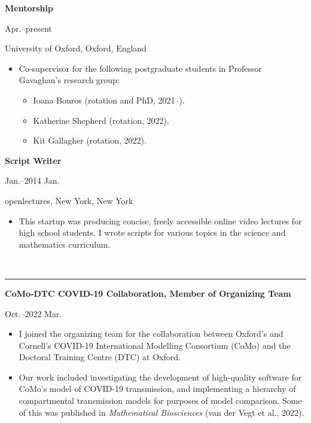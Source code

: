 \documentclass[11pt]{article}
\begin{document}
\noindent\parbox{.75\textwidth}{\raggedright \textbf{Mentorship}}
\parbox{.25\textwidth}{ Apr.--present}
University of Oxford, Oxford, England
\vspace{-.15cm}
\begin{itemize}
\setlength{\itemsep}{4pt}
\setlength{\parskip}{0pt}
\setlength{\parsep}{0pt}
\item Co-supervisor for the following postgraduate students in Professor Gavaghan's research group:
\begin{itemize}
\setlength{\itemsep}{0pt}
\item Ioana Bouros (rotation and PhD, 2021--).
\item Katherine Shepherd (rotation, 2022).
\item Kit Gallagher (rotation, 2022).
\end{itemize}
\end{itemize}


\vspace{0.2cm}

\noindent\parbox{.75\textwidth}{\raggedright \textbf{Script Writer}}
\parbox{.25\textwidth}{ Jan.--2014 Jan.}
openlectures, New York, New York
\vspace{-.25cm}
\begin{itemize}
\setlength{\itemsep}{4pt}
\setlength{\parskip}{0pt}
\setlength{\parsep}{0pt}
\item This startup was producing concise, freely accessible online video lectures for high school students. I wrote scripts for various topics in the science and mathematics curriculum.
\end{itemize}

\vspace{0.5cm}

\vspace{-2.75mm} \\
\rule{\textwidth}{0.4pt}
\vspace{0.1mm}
\noindent\parbox{.75\textwidth}{\raggedright \textbf{CoMo-DTC COVID-19 Collaboration, Member of Organizing Team}}
\parbox{.25\textwidth}{ Oct.--2022 Mar.}
\vspace{-.65cm}
\begin{itemize}
\setlength{\itemsep}{4pt}
\setlength{\parskip}{0pt}
\setlength{\parsep}{0pt}
\item I joined the organizing team for the collaboration between Oxford's and Cornell's COVID-19 International Modelling Consortium (CoMo) and the Doctoral Training Centre (DTC) at Oxford.
\item Our work included investigating the development of high-quality software for CoMo's model of COVID-19 transmission, and implementing a hierarchy of compartmental transmission models for purposes of model comparison. Some of this was published in \emph{Mathematical Biosciences} (van der Vegt et al., 2022).
\end{itemize}
\end{document}
